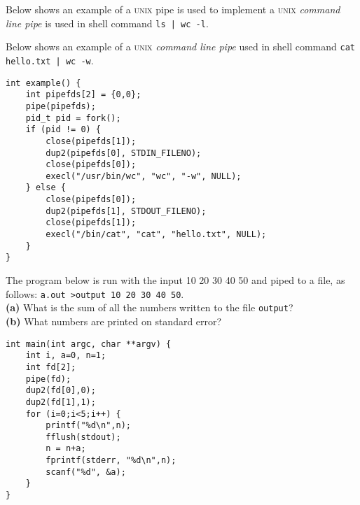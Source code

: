 \begin{example}
Below shows an example of a \textsc{unix} pipe is used to 
implement a \textsc{unix} \textit{command line pipe}  is used 
in shell command \lstinline{ls | wc -l}.

\begin{figure}[h]
\end{figure} 
\end{example}



\frmrule

\begin{example}
Below shows an example of a \textsc{unix} \textit{command line pipe} 
used in shell command \lstinline{cat hello.txt | wc -w}.

\begin{lstlisting}
int example() {
    int pipefds[2] = {0,0};
    pipe(pipefds);
    pid_t pid = fork();
    if (pid != 0) { 
        close(pipefds[1]);
        dup2(pipefds[0], STDIN_FILENO);
        close(pipefds[0]);
        execl("/usr/bin/wc", "wc", "-w", NULL);
    } else { 
        close(pipefds[0]);
        dup2(pipefds[1], STDOUT_FILENO);
        close(pipefds[1]);
        execl("/bin/cat", "cat", "hello.txt", NULL);
    }
}
\end{lstlisting}
\end{example}



\frmrule

\begin{example}
The program below is run with the input 10 20 30 40 50 and piped to a file, as follows: 
\lstinline{a.out >output 10 20 30 40 50}. \\
\textbf{(a)} What is the sum of all the numbers written to the file \lstinline{output}? \\
\textbf{(b)} What numbers are printed on standard error?

\begin{lstlisting}
int main(int argc, char **argv) {
    int i, a=0, n=1;
    int fd[2];
    pipe(fd);
    dup2(fd[0],0);
    dup2(fd[1],1);
    for (i=0;i<5;i++) {
        printf("%d\n",n);
        fflush(stdout);
        n = n+a;
        fprintf(stderr, "%d\n",n);
        scanf("%d", &a);
    }
}
\end{lstlisting}
\end{example}

